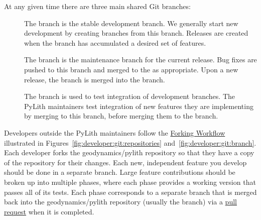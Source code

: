 At any given time there are three main shared Git branches:
\begin{description}
\item[] The  branch is the
  stable development branch. We generally start new development by
  creating branches from this branch. Releases are created when the
   branch has accumulated a desired set of features.
\item[] The  branch is the
  maintenance branch for the current release. Bug fixes are pushed
  to this branch and merged to the  as
  appropriate. Upon a new release, the  branch is
  merged into the  branch.
\item[] The  branch is used to test
  integration of development branches. The PyLith maintainers test
  integration of new features they are implementing by merging to
  this branch, before merging them to the 
  branch.
\end{description}

Developers outside the PyLith maintainers follow the
\href{https://www.atlassian.com/git/tutorials/comparing-workflows/forking-workflow}{Forking
  Workflow} illustrated in
Figures~\vref{fig:developer:git:repositories}
and~\vref{fig:developer:git:branch}. Each developer forks the
geodynamics/pylith repository so that they have a copy of
the repository for their changes. Each new, independent feature you
develop should be done in a separate branch. Large feature
contributions should be broken up into multiple phases, where each
phase provides a working version that passes all of its tests. Each
phase corresponds to a separate branch that is merged back into the
geodynamics/pylith repository (usually the
 branch) via a
\href{https://help.github.com/articles/about-pull-requests/}{pull
  request} when it is completed.

